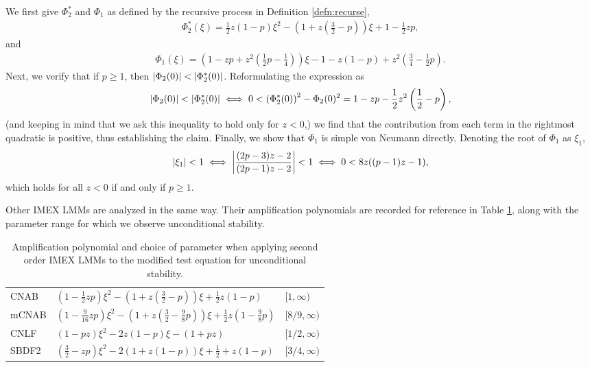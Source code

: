 We first give $\Phi_2^*$ and $\Phi_1$ as defined by the recursive process in Definition \ref{defn:recurse},
\begin{align}
\Phi_2^*(\xi) = \frac{1}{2}z(1-p) \xi^2 
- \left(1 + z\left(\frac{3}{2} - p \right)\right) \xi
+ 1 - \frac{1}{2}zp, 
\end{align}
and
\begin{align} 
\Phi_1(\xi) = \left(1 - zp + z^2 \left( \frac{1}{2} p - \frac{1}{4} \right) \right)\xi -1 - z(1-p) + z^2 \left( \frac{3}{4} - \frac{1}{2}p \right).
\end{align}
Next, we verify that if $p\geq 1$, then $\left|\Phi_2(0)\right| < \left|\Phi^*_2(0)\right|$. Reformulating the expression as
\begin{align*}
\left|\Phi_2(0)\right| < \left|\Phi^*_2(0)\right| 
\iff 
0 < \left(\Phi^*_2(0) \right)^2 - \Phi_2(0)^2
= 1 - zp - \frac{1}{2}z^2\left( \frac{1}{2} - p \right),
\end{align*}
(and keeping in mind that we ask this inequality to hold only for $z<0$,) we find that the contribution from each term  in the rightmost quadratic is positive, thus establishing the claim.
Finally, we show that $\Phi_1$ is simple von Neumann directly. Denoting the root of $\Phi_1$ as $\xi_1$, 
\begin{align*}
	\left|\xi_1\right| < 1 
\iff \left|\frac{(2p-3)z-2}{(2p-1)z-2}\right| < 1
\iff 0< 8z((p-1)z-1),  
\end{align*}
which holds for all $z<0$ if and only if $p\geq 1$.

Other IMEX LMMs are analyzed in the same way. Their amplification polynomials are recorded for reference in Table \ref{table:amp poly 2}, along with the parameter range for which we observe unconditional stability.

\begin{table}[htb!]
	\centering
	\caption{Amplification polynomial and choice of parameter when applying second order IMEX LMMs to the modified test equation for unconditional stability.}
	\begin{tabular}{lll}
		\toprule[1.5pt] 
		\head{Method} 
		& \head{Amplification Polynomial}
		& \head{$p\lambda/\lambda\in$}
		\\	\midrule 
		CNAB 
		& $\left(1 - \frac{1}{2}zp\right)\xi^2
		- \left(1 + z\left(\frac{3}{2}-p \right)\right)\xi + \frac{1}{2}z(1-p)$
		& $[1,\infty)$
		\\[2.6pt]
		mCNAB 
		& $\left(1 - \frac{9}{16}zp \right) \xi^2 - \left(1 + z\left(\frac{3}{2} - \frac{9}{8} p \right) \right)\xi
		+ \frac{1}{2}z\left(1 - \frac{9}{8}p \right) $
		& $[8/9,\infty)$
		\\[2.6pt]
		CNLF 
		& $\left(1-pz\right) \xi^2 -2z(1-p)\xi -(1+pz)$
		& $[1/2,\infty)$
		\\[2.6pt]
		SBDF2 
		& $\left(\frac{3}{2} - zp\right) \xi^2
		- 2\left(1 + z(1-p)\right) \xi 
		+ \frac{1}{2} + z(1-p)
		$
		& $[3/4,\infty)$
		\\ \bottomrule[1.5pt]
	\end{tabular}
\label{table:amp poly 2}
\end{table}

